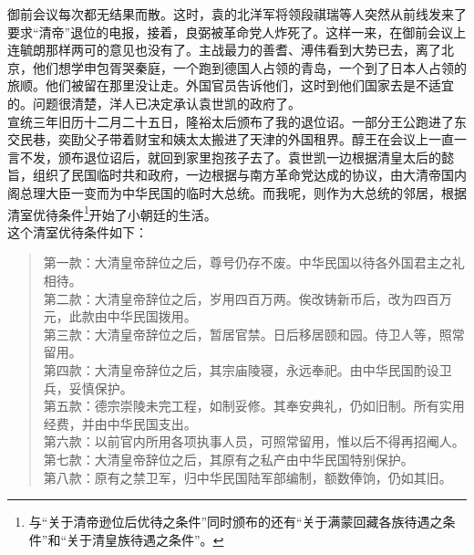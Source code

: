 御前会议每次都无结果而散。这时，袁的北洋军将领段祺瑞等人突然从前线发来了要求“清帝”退位的电报，接着，良弼被革命党人炸死了。这样一来，在御前会议上连毓朗那样两可的意见也没有了。主战最力的善耆、溥伟看到大势已去，离了北京，他们想学申包胥哭秦庭，一个跑到德国人占领的青岛，一个到了日本人占领的旅顺。他们被留在那里没让走。外国官员告诉他们，这时到他们国家去是不适宜的。问题很清楚，洋人已决定承认袁世凯的政府了。\\

宣统三年旧历十二月二十五日，隆裕太后颁布了我的退位诏。一部分王公跑进了东交民巷，奕劻父子带着财宝和姨太太搬进了天津的外国租界。醇王在会议上一直一言不发，颁布退位诏后，就回到家里抱孩子去了。袁世凯一边根据清皇太后的懿旨，组织了民国临时共和政府，一边根据与南方革命党达成的协议，由大清帝国内阁总理大臣一变而为中华民国的临时大总统。而我呢，则作为大总统的邻居，根据清室优待条件\footnote{与“关于清帝逊位后优待之条件”同时颁布的还有“关于满蒙回藏各族待遇之条件”和“关于清皇族待遇之条件”。}开始了小朝廷的生活。\\

这个清室优待条件如下：\\

\begin{quote}
	第一款：大清皇帝辞位之后，尊号仍存不废。中华民国以待各外国君主之礼相待。\\

第二款：大清皇帝辞位之后，岁用四百万两。俟改铸新币后，改为四百万元，此款由中华民国拨用。\\

第三款：大清皇帝辞位之后，暂居官禁。日后移居颐和园。侍卫人等，照常留用。\\

第四款：大清皇帝辞位之后，其宗庙陵寝，永远奉祀。由中华民国酌设卫兵，妥慎保护。\\

第五款：德宗崇陵未完工程，如制妥修。其奉安典礼，仍如旧制。所有实用经费，并由中华民国支出。\\

第六款：以前官内所用各项执事人员，可照常留用，惟以后不得再招阉人。\\

第七款：大清皇帝辞位之后，其原有之私产由中华民国特别保护。\\

第八款：原有之禁卫军，归中华民国陆军部编制，额数俸饷，仍如其旧。\\
\end{quote}